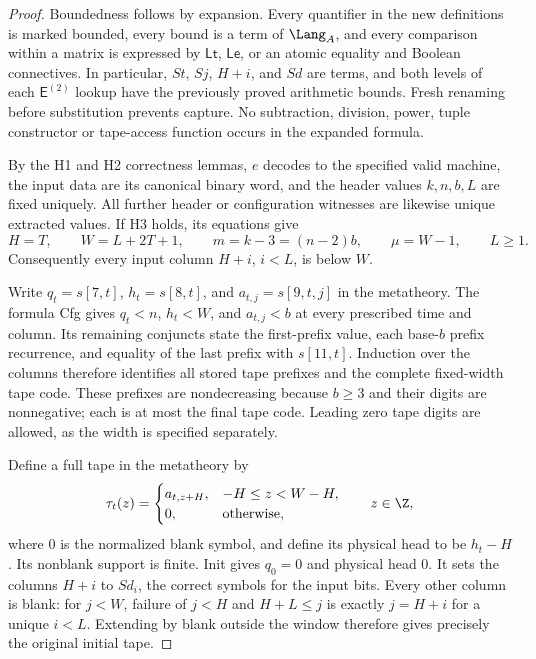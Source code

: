 \begin{proof}
Boundedness follows by expansion.  Every quantifier in the new
definitions is marked bounded, every bound is a term of \(\Lang_A\),
and every comparison within a matrix is expressed by
\(\mathsf{Lt}\), \(\mathsf{Le}\), or an atomic equality and Boolean
connectives.  In particular, \(St\), \(Sj\), \(H+i\), and \(Sd\)
are terms, and both levels of each \(\mathsf E^{(2)}\) lookup have
the previously proved arithmetic bounds.  Fresh renaming before
substitution prevents capture.  No subtraction, division, power,
tuple constructor or tape-access function occurs in the expanded
formula.

By the H1 and H2 correctness lemmas, \(e\) decodes to the specified
valid machine, the input data are its canonical binary word, and
the header values \(k,n,b,L\) are fixed uniquely.  All further
header or configuration witnesses are likewise unique extracted
values.  If H3 holds, its equations give
\[
 H=T,\qquad W=L+2T+1,\qquad m=k-3=(n-2)b,\qquad \mu=W-1,
 \qquad L\geq1.
\]
Consequently every input column \(H+i\), \(i<L\), is below \(W\).

Write \(q_t=s[7,t]\), \(h_t=s[8,t]\), and
\(a_{t,j}=s[9,t,j]\) in the metatheory.  The formula Cfg gives
\(q_t<n\), \(h_t<W\), and \(a_{t,j}<b\) at every prescribed time
and column.  Its remaining conjuncts state the first-prefix value,
each base-\(b\) prefix recurrence, and equality of the last prefix
with \(s[11,t]\).  Induction over the columns therefore identifies
all stored tape prefixes and the complete fixed-width tape code.
These prefixes are nondecreasing because \(b\geq3\) and their
digits are nonnegative; each is at most the final tape code.
Leading zero tape digits are allowed, as the width is specified
separately.

Define a full tape in the metatheory by
\[
 \tau_t(z)=
 \begin{cases}
    a_{t,z+H},&-H\leq z<W-H,\\
    0,&\text{otherwise},
 \end{cases}
 \qquad z\in\Z,
\]
where \(0\) is the normalized blank symbol, and define its physical
head to be \(h_t-H\).  Its nonblank support is finite.
Init gives \(q_0=0\) and physical head \(0\).  It sets the columns
\(H+i\) to \(Sd_i\), the correct symbols for the input bits.
Every other column is blank: for \(j<W\), failure of
\(j<H\) and \(H+L\leq j\) is exactly \(j=H+i\) for a unique
\(i<L\).  Extending by blank outside the window therefore gives
precisely the original initial tape.


\end{proof}
